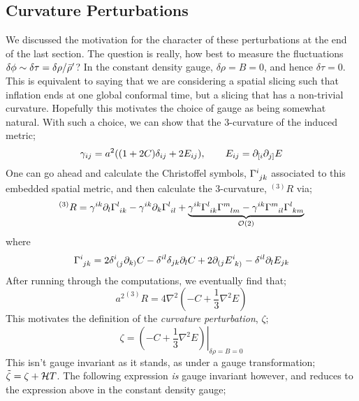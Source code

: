 \subsection{Curvature Perturbations}
We discussed the motivation for the character of these perturbations at the end of the last section. The question is really, how best to measure the fluctuations $\delta \phi \sim \delta \tau = \delta \rho/\bar{\rho}^{\prime}$? In the constant density gauge, $\delta \rho = B = 0$, and hence $\delta \tau = 0$. This is equivalent to saying that we are considering a spatial slicing such that inflation ends at one global conformal time, but a slicing that has a non-trivial curvature. Hopefully this motivates the choice of gauge as being somewhat natural. With such a choice, we can show that the $3$-curvature of the induced metric;
\begin{equation*}
\gamma_{ij} = a^2 \left((1 + 2C)\delta_{ij} + 2E_{ij}\right), \qquad E_{ij} = \del_{[i}\del_{j]}E
\end{equation*}
One can go ahead and calculate the Christoffel symbols, $\Gamma\indices{^{i}_{jk}}$ associated to this embedded spatial metric, and then calculate the $3$-curvature, $^{(3)}R$ via;
\begin{equation}
^{(3)}R = \gamma^{ik}\del_l \Gamma\indices{^{l}_{ik}} - \gamma^{ik}\del_k  \Gamma\indices{^{l}_{il}} + \underbrace{\gamma^{ik}  \Gamma\indices{^{l}_{ik}}  \Gamma\indices{^{m}_{lm}} - \gamma^{ik}\Gamma\indices{^{m}_{il}} \Gamma\indices{^{l}_{km}}}_{\mO(2)}
\end{equation}
where 
\begin{equation*}
\Gamma\indices{^{i}_{jk}} = 2\delta\indices{^{i}_{(j}}\del_{k)}C - \delta^{il}\delta_{jk}\del_l C + 2\del_{(j}E\indices{^{i}_{k)}}- \delta^{il}\del_l E_{jk}
\end{equation*}
After running through the computations, we eventually find that;
\begin{equation}
\left.a^2\right. ^{(3)}R = 4 \nabla^2\left(-C + \frac{1}{3}\nabla^2 E\right)
\end{equation}
This motivates the definition of the \emph{curvature perturbation}, $\zeta$;
\begin{equation}
\zeta = \left.\left(- C + \frac{1}{3}\nabla^2 E\right)\right|_{\delta \rho = B = 0}
\end{equation}
This isn't gauge invariant as it stands, as under a gauge transformation; $\tilde{\zeta} = \zeta + \mathcal{H} T$. The following expression \emph{is} gauge invariant however, and reduces to the expression above in the constant density gauge;
